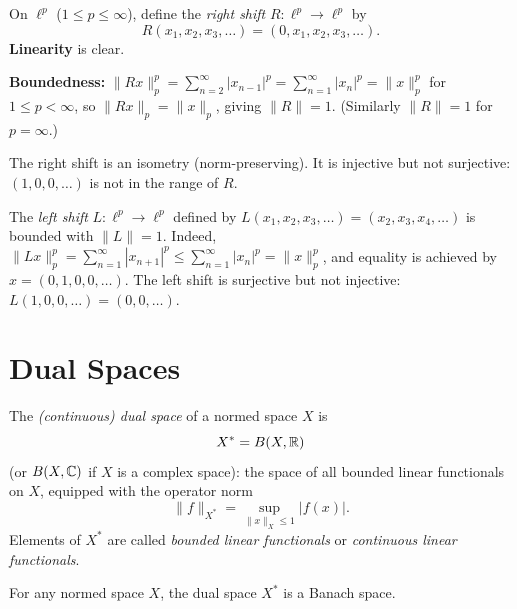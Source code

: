 \documentclass[11pt,a4paper]{article}
\begin{document}
\begin{example}
\label{ex:shift}
On $\ell^p$ ($1 \le p \le \infty$), define the \emph{right shift}
$R \colon \ell^p \to \ell^p$ by
\[
R(x_1, x_2, x_3, \ldots) = (0, x_1, x_2, x_3, \ldots).
\]
\textbf{Linearity} is clear.

\textbf{Boundedness:} $\|Rx\|_p^p = \sum_{n=2}^\infty |x_{n-1}|^p =
\sum_{n=1}^\infty |x_n|^p = \|x\|_p^p$ for $1 \le p < \infty$, so
$\|Rx\|_p = \|x\|_p$, giving $\|R\| = 1$. (Similarly $\|R\| = 1$ for
$p = \infty$.)

The right shift is an isometry (norm-preserving). It is injective but not
surjective: $(1, 0, 0, \ldots)$ is not in the range of $R$.
\end{example}

\begin{example}
\label{ex:left_shift}
The \emph{left shift} $L \colon \ell^p \to \ell^p$ defined by
$L(x_1, x_2, x_3, \ldots) = (x_2, x_3, x_4, \ldots)$ is bounded with
$\|L\| = 1$. Indeed,
$\|Lx\|_p^p = \sum_{n=1}^\infty |x_{n+1}|^p \le \sum_{n=1}^\infty |x_n|^p =
\|x\|_p^p$, and equality is achieved by $x = (0, 1, 0, 0, \ldots)$.
The left shift is surjective but not injective:
$L(1, 0, 0, \ldots) = (0, 0, \ldots)$.
\end{example}


\section{Dual Spaces}
\label{sec:dual}

\begin{definition}
\label{def:dual}
The \emph{(continuous) dual space} of a normed space $X$ is
\[
X^* = B(X, \mathbb{R})
\]
(or $B(X, \mathbb{C})$ if $X$ is a complex space): the space of all bounded linear
functionals on $X$, equipped with the operator norm
\[
\|f\|_{X^*} = \sup_{\|x\|_X \le 1} |f(x)|.
\]
Elements of $X^*$ are called \emph{bounded linear functionals} or
\emph{continuous linear functionals}.
\end{definition}

\begin{corollary}
\label{cor:dual_banach}
For any normed space $X$, the dual space $X^*$ is a Banach space.
\end{corollary}
\end{document}
